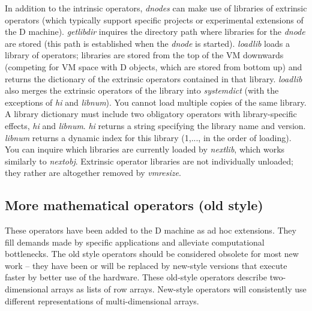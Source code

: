 In addition to the intrinsic operators, \emph{dnodes} can make use of libraries of extrinsic operators (which typically support specific projects or experimental extensions of the D machine). \emph{getlibdir} inquires the directory path where libraries for the \emph{dnode} are stored (this path is established when the \emph{dnode} is started). \emph{loadlib} loads a library of operators; libraries are stored from the top of the VM downwards (competing for VM space with D objects, which are stored from bottom up) and returns the dictionary of the extrinsic operators contained in that library. \emph{loadlib} also merges the extrinsic operators of the library into \emph{systemdict} (with the exceptions of \emph{hi} and \emph{libnum}). You cannot load multiple copies of the same library. A library dictionary must include two obligatory operators with library-specific effects, \emph{hi} and \emph{libnum}. \emph{hi} returns a string specifying the library name and version. \emph{libnum} returns a dynamic index for this library (1,..., in the order of loading). You can inquire which libraries are currently loaded by \emph{nextlib}, which works similarly to \emph{nextobj}. Extrinsic operator libraries are not individually unloaded; they rather are altogether removed by \emph{vmresize}.


\subsection{More mathematical operators (old style)}\label{ssec:oldstyle}

These operators have been added to the D machine as ad hoc extensions. They fill demands made by specific applications and alleviate computational bottlenecks. The old style operators should be considered obsolete for most new work -- they have been or will be replaced by new-style versions that execute faster by better use of the hardware. These old-style operators describe two-dimensional arrays as lists of row arrays. New-style operators will consistently use different representations of multi-dimensional arrays.\\


